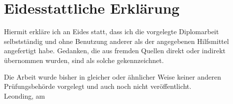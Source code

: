 
\section*{Eidesstattliche Erklärung}
Hiermit erkläre ich an Eides statt, dass ich die vorgelegte Diplomarbeit selbstständig und ohne Benutzung anderer als der angegebenen Hilfsmittel angefertigt habe. Gedanken, die aus fremden Quellen direkt oder indirekt übernommen wurden, sind als solche gekennzeichnet.

Die Arbeit wurde bisher in gleicher oder ähnlicher Weise keiner anderen Prüfungsbehörde vorgelegt und auch noch nicht veröffentlicht. \\[1em]
Leonding, am \duedatede \\[5em]
\ifthenelse{\isundefined{\firstauthor}}{}{\firstauthor}
\ifthenelse{\isundefined{\secondauthor}}{}{\kern-1ex, \secondauthor}
\ifthenelse{\isundefined{\thirdauthor}}{}{\kern-1ex, \thirdauthor} \\[5em]


